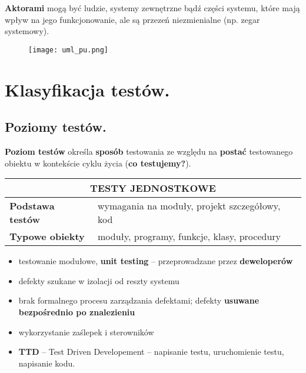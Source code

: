 \documentclass[main.tex]{subfiles}
\begin{document}
    \noindent \textbf{Aktorami} mogą być ludzie, systemy zewnętrzne bądź części systemu, które mają wpływ na jego funkcjonowanie,
    ale są przezeń niezmienialne (np. zegar systemowy).

    \begin{figure}[H]
        \texttt{[image: uml\_pu.png]}
    \end{figure}


    \section{Klasyfikacja testów.}

    \subsection{Poziomy testów.}
    \begin{definition}
        \textbf{Poziom testów} określa \textbf{sposób} testowania ze względu na \textbf{postać}
        testowanego obiektu w kontekście cyklu życia (\textbf{co testujemy?}).
    \end{definition}

    \begin{table}[H]
        \begin{center}
            \begin{tabular}{| p{4cm}| p{12cm}|}
                \hline
                \multicolumn{2}{|c|}{ \textbf{TESTY JEDNOSTKOWE}}\\
                \hline
                \textbf{Podstawa testów} & wymagania na moduły, projekt szczegółowy, kod\\
                \hline
                \textbf{Typowe obiekty} & moduły, programy, funkcje, klasy, procedury\\
                \hline
            \end{tabular}
        \end{center}
    \end{table}

    \begin{itemize}[noitemsep]
        \item testowanie modułowe, \textbf{unit testing} -- przeprowadzane przez \textbf{deweloperów}
        \item defekty szukane w izolacji od reszty systemu
        \item brak formalnego procesu zarządzania defektami; defekty \textbf{usuwane bezpośrednio po znalezieniu}
        \item wykorzystanie zaślepek i sterowników
        \item \textbf{TTD} -- Test Driven Developement -- napisanie testu, uruchomienie testu, napisanie kodu.
    \end{itemize}
\end{document}
